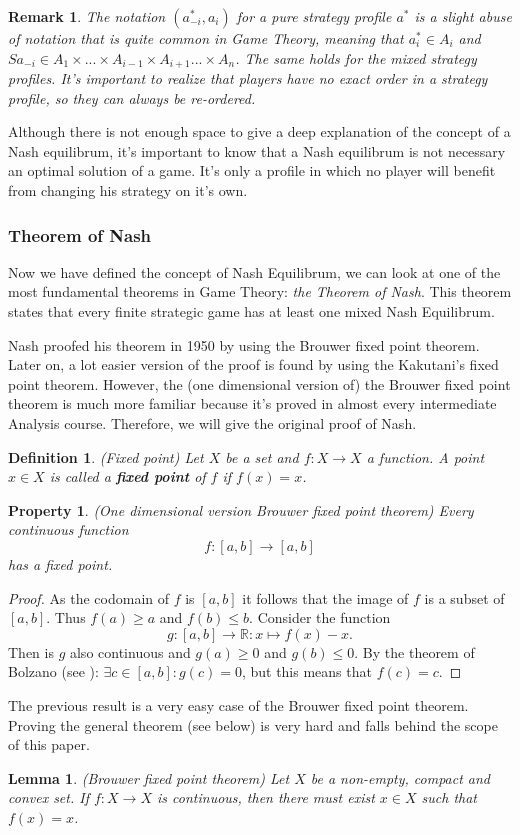 \documentclass[a4paper,11pt]{article}
\newtheorem{lemma}[theorem]{Lemma}
\newtheorem{property}[theorem]{Property}
\newtheorem{definition}[theorem]{Definition}
\newtheorem{remark}[theorem]{Remark}
\newcommand{\R}{{\mathbb R}}
\begin{document}
\begin{remark}\label{herordening}
The notation $(a_{-i}^*, a_{i})$ for a pure strategy profile $a^*$ is a slight abuse of notation that is quite common in Game Theory, meaning that $a_i^* \in A_i$ and $Sa_{-i} \in A_1\times ... \times A_{i-1} \times A_{i+1} ... \times A_n$. The same holds for the mixed strategy profiles. It's important to realize that players have no exact order in a strategy profile, so they can always be re-ordered.
\end{remark}

Although there is not enough space to give a deep explanation of the concept of a Nash equilibrum, it's important to know that a Nash equilibrum is not necessary an optimal solution of a game. It's only a profile in which no player will benefit from changing his strategy on it's own.

\subsubsection{Theorem of Nash}
Now we have defined the concept of Nash Equilibrum, we can look at one of the most fundamental theorems in Game Theory: \emph{the Theorem of Nash}. This theorem states that every finite strategic game has at least one mixed Nash Equilibrum.

Nash proofed his theorem in 1950 by using the Brouwer fixed point theorem. Later on, a lot easier version of the proof is found by using the Kakutani's fixed point theorem. However, the (one dimensional version of) the Brouwer fixed point theorem is much more familiar because it's proved in almost every intermediate Analysis course. Therefore, we will give the original proof of Nash.

\begin{definition}(Fixed point)\cite{11}
Let $X$ be a set and $f: X \rightarrow X$ a function. A point $x \in X$ is called a \textbf{fixed point} of $f$ if $f(x)=x$.
\end{definition}

\begin{property}(One dimensional version Brouwer fixed point theorem) \cite{11}
 Every continuous function $$f: [a,b] \rightarrow [a,b]$$  has a fixed point.
\end{property}
\begin{proof}
As the codomain of $f$ is $[a,b]$ it follows that the image of $f$ is a subset of $[a,b]$. Thus $f(a) \geq a$ and $f(b) \leq b$. Consider the function $$g: [a,b] \rightarrow \R: x \mapsto f(x) - x.$$
Then is $g$ also continuous and $g(a) \geq 0$ and $g(b) \leq 0$. By the theorem of Bolzano (see \cite{11}): $\exists c \in [a, b]: g(c) = 0$, but this means that $f(c) = c$.
\end{proof}
 The previous result is a very easy case of the Brouwer fixed point theorem. Proving the general theorem (see below) is very hard and falls behind the scope of this paper.
\begin{lemma}(Brouwer fixed point theorem)
Let $X$ be a non-empty, compact and convex set. If $f : X \rightarrow X$ is continuous, then there must exist $x \in X$ such that $f(x) = x$.
\end{lemma}
\end{document}
